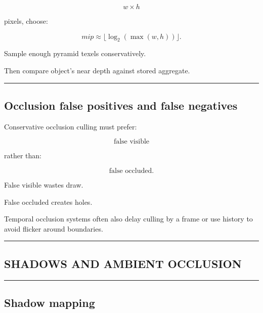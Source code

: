 \[
w\times h
\]

pixels, choose:

\[
mip\approx
\lfloor\log_2(\max(w,h))\rfloor.
\]

Sample enough pyramid texels conservatively.

Then compare object's near depth against stored aggregate.

\begin{center}\rule{0.5\linewidth}{0.5pt}\end{center}

\subsection{Occlusion false positives and false negatives}\label{04-visual-computing-ii-ch040-occlusion-false-positives-and-false-negatives}

\hypertarget{04-visual-computing-ii-ch040-occlusion-false-positives-and-false-negatives}{}

Conservative occlusion culling must prefer:

\[
\boxed{
\text{false visible}
}
\]

rather than:

\[
\boxed{
\text{false occluded}.
}
\]

False visible wastes draw.

False occluded creates holes.

Temporal occlusion systems often also delay culling by a frame or use history to avoid flicker around boundaries.

\begin{center}\rule{0.5\linewidth}{0.5pt}\end{center}

\subsection{SHADOWS AND AMBIENT OCCLUSION}\label{04-visual-computing-ii-ch040-shadows-and-ambient-occlusion}

\hypertarget{04-visual-computing-ii-ch040-shadows-and-ambient-occlusion}{}

\begin{center}\rule{0.5\linewidth}{0.5pt}\end{center}

\subsection{Shadow mapping}\label{04-visual-computing-ii-ch040-shadow-mapping}

